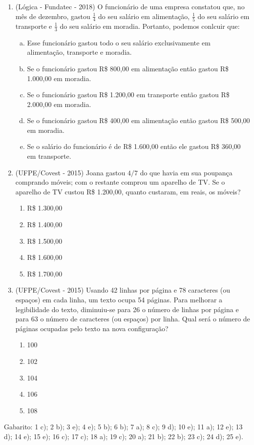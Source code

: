 \begin{enumerate}
 \item (Lógica - Fundatec - 2018) O funcionário de uma empresa constatou que, no mês de dezembro, gastou $\frac{1}{4}$ do seu salário em alimentação, $\frac{1}{5}$ do seu salário em transporte e $\frac{1}{3}$ do seu salário em moradia. Portanto, podemos conlcuir que:
\begin{enumerate}[a)]
\item Esse funcionário gastou todo o seu salário exclusivamente em alimentação, transporte e moradia.
\item Se o funcionário gastou R\$ 800,00 em alimentação então gastou R\$ 1.000,00 em moradia.
\item Se o funcionário gastou R\$ 1.200,00 em transporte então gastou R\$ 2.000,00 em moradia.
\item Se o funcionário gastou R\$ 400,00 em alimentação então gastou R\$ 500,00 em moradia.
\item Se o salário do funcionário é de R\$ 1.600,00 então ele gastou R\$ 360,00 em transporte.
\end{enumerate}

 \item (UFPE/Covest - 2015) Joana gastou $4/7$ do que havia em sua poupança comprando móveis; com o restante comprou um aparelho de TV. Se o aparelho de TV custou R\$ 1.200,00, quanto custaram, em reais, os móveis?
 \begin{enumerate}
 \item R\$ 1.300,00
 \item R\$ 1.400,00
 \item R\$ 1.500,00
 \item R\$ 1.600,00
 \item R\$ 1.700,00
 \end{enumerate}

 \item (UFPE/Covest - 2015) Usando 42 linhas por página e 78 caracteres (ou espaços) em cada linha, um texto ocupa 54 páginas. Para melhorar a legibilidade do texto, diminuiu-se para 26 o número de linhas por página e para 63 o número de caracteres (ou espaços) por linha. Qual será o número de páginas ocupadas pelo texto na nova configuração?
 \begin{enumerate}
 \item 100
 \item 102
 \item 104
 \item 106
 \item 108
 \end{enumerate}

 \end{enumerate}

 Gabarito: 1 c); 2 b); 3 e); 4 e); 5 b); 6 b); 7 a); 8 c); 9 d); 10 e); 11 a); 12 e); 13 d); 14 e); 15 e); 16 c); 17 c); 18 a); 19 c); 20 a); 21 b); 22 b); 23 c); 24 d); 25 e).
